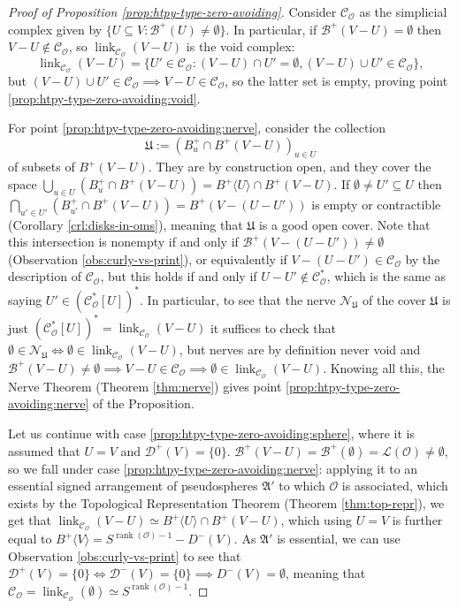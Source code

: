 \documentclass[a4paper,11pt,reqno, english]{amsart}
\theoremstyle{definition}
\theoremstyle{remark}
\DeclareMathOperator{\link}{\mathrm{link}}
\begin{document}
\begin{proof}[Proof of Proposition \ref{prop:htpy-type-zero-avoiding}]
    Consider $\mathscr{C}_\mathscr{O}$ as the simplicial complex given by $\{U\subseteq V: \mathscr{B}^+(U)\neq\emptyset\}$. In particular, if $\mathscr{B}^+(V-U)=\emptyset$ then $V-U\notin\mathscr{C}_\mathscr{O}$, so $\link_{\mathscr{C}_\mathscr{O}}(V-U)$ is the void complex:
    \[
        \link_{\mathscr{C}_\mathscr{O}}(V-U)=\{U'\in\mathscr{C}_\mathscr{O}: (V-U)\cap U'=\emptyset,(V-U)\cup U'\in\mathscr{C}_\mathscr{O}\},
    \]
    but $(V-U)\cup U'\in\mathscr{C}_\mathscr{O}\implies V-U\in\mathscr{C}_\mathscr{O}$, so the latter set is empty, proving point \ref{prop:htpy-type-zero-avoiding:void}.

    For point \ref{prop:htpy-type-zero-avoiding:nerve}, consider the collection
    \[
        \mathfrak{U}:=(B_u^+\cap B^+(V-U))_{u\in U}
    \]
    of subsets of $B^+(V-U)$. They are by construction open, and they cover the space $\bigcup_{u\in U}(B^+_u\cap B^+(V-U))=B^+\langle U\rangle\cap B^+(V-U)$. If $\emptyset\neq U'\subseteq U$ then $\bigcap_{u'\in U'}(B^+_{u'}\cap B^+(V-U))=B^+(V-(U-U'))$ is empty or contractible (Corollary \ref{crl:disks-in-oms}), meaning that $\mathfrak{U}$ is a good open cover. Note that this intersection is nonempty if and only if $\mathscr{B}^+(V-(U-U'))\neq\emptyset$ (Observation \ref{obs:curly-vs-print}), or equivalently if $V-(U-U')\in\mathscr{C}_\mathscr{O}$ by the description of $\mathscr{C}_\mathscr{O}$, but this holds if and only if $U-U'\notin\mathscr{C}_\mathscr{O}^*$, which is the same as saying $U'\in(\mathscr{C}_\mathscr{O}^*[U])^*$. In particular, to see that the nerve $\mathscr{N}_\mathfrak{U}$ of the cover $\mathfrak{U}$ is just $(\mathscr{C}_\mathscr{O}^*[U])^*=\link_{\mathscr{C}_\mathscr{O}}(V-U)$ it suffices to check that $\emptyset\in\mathscr{N}_{\mathfrak{U}}\iff\emptyset\in\link_{\mathscr{C}_\mathscr{O}}(V-U)$, but nerves are by definition never void and $\mathscr{B}^+(V-U)\neq\emptyset\implies V-U\in\mathscr{C}_\mathscr{O}\implies\emptyset\in\link_{\mathscr{C}_\mathscr{O}}(V-U)$. Knowing all this, the Nerve Theorem (Theorem \ref{thm:nerve}) gives point \ref{prop:htpy-type-zero-avoiding:nerve} of the Proposition.

    Let us continue with case \ref{prop:htpy-type-zero-avoiding:sphere}, where it is assumed that $U=V$ and $\mathscr{D}^+(V)=\{0\}$. $\mathscr{B}^+(V-U)=\mathscr{B}^+(\emptyset)=\mathscr{L}(\mathscr{O})\neq\emptyset$, so we fall under case \ref{prop:htpy-type-zero-avoiding:nerve}: applying it to an essential signed arrangement of pseudospheres $\mathfrak{A}'$ to which $\mathscr{O}$ is associated, which exists by the Topological Representation Theorem (Theorem \ref{thm:top-repr}), we get that $\link_{\mathscr{C}_\mathscr{O}}(V-U)\simeq B^+\langle U\rangle\cap B^+(V-U)$, which using $U=V$ is further equal to $B^+\langle V\rangle=S^{\operatorname{rank}(\mathscr{O})-1}-D^-(V)$. As $\mathfrak{A}'$ is essential, we can use Observation \ref{obs:curly-vs-print} to see that $\mathscr{D}^+(V)=\{0\}\iff\mathscr{D}^-(V)=\{0\}\implies D^-(V)=\emptyset$, meaning that $\mathscr{C}_\mathscr{O}=\link_{\mathscr{C}_\mathscr{O}}(\emptyset)\simeq S^{\operatorname{rank}(\mathscr{O})-1}$.


\end{proof}
\end{document}
